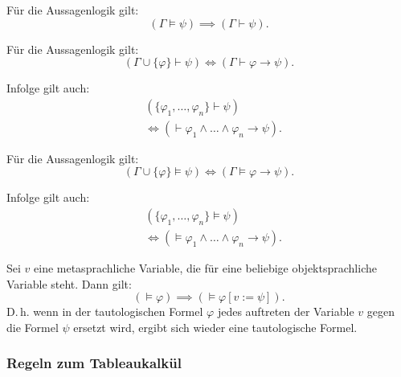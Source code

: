 Für die Aussagenlogik gilt:
\begin{equation}
(\Gamma\models\psi)\implies (\Gamma\vdash\psi).
\end{equation}

\noindent
{}

Für die Aussagenlogik gilt:
\begin{equation}
(\Gamma\cup\{\varphi\}\vdash\psi)\iff (\Gamma\vdash\varphi\rightarrow\psi).
\end{equation}

Infolge gilt auch:
\begin{equation}
\begin{split}
&(\{\varphi_1,\ldots,\varphi_n\}\vdash\psi)\\
&\iff (\vdash \varphi_1\land\ldots\land\varphi_n\rightarrow\psi).
\end{split}
\end{equation}

\noindent
{}

Für die Aussagenlogik gilt:
\begin{equation}
(\Gamma\cup\{\varphi\}\models\psi)\iff (\Gamma\models\varphi\rightarrow\psi).
\end{equation}

Infolge gilt auch:
\begin{equation}
\begin{split}
&(\{\varphi_1,\ldots,\varphi_n\}\models\psi)\\
&\iff (\models \varphi_1\land\ldots\land\varphi_n\rightarrow\psi).
\end{split}
\end{equation}

\noindent
{}

Sei $v$ eine metasprachliche Variable, die für eine beliebige
objektsprachliche Variable steht. Dann gilt:
\begin{equation}
(\models\varphi) \implies (\models\varphi[v:=\psi]).
\end{equation}
D.\,h. wenn in der tautologischen Formel $\varphi$ jedes auftreten
der Variable $v$ gegen die Formel $\psi$ ersetzt wird, ergibt
sich wieder eine tautologische Formel.

\subsubsection{Regeln zum Tableaukalkül}

